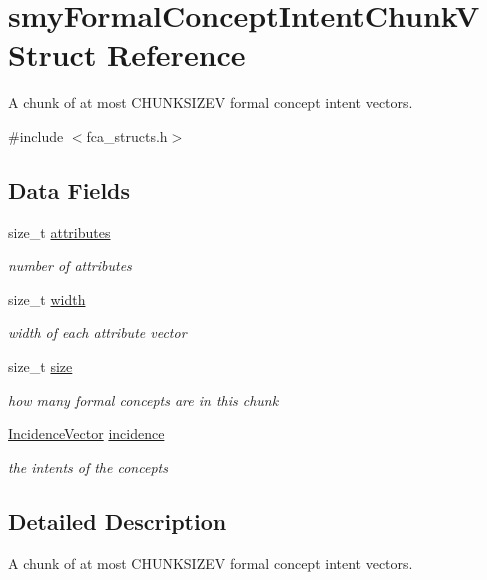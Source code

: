 \hypertarget{structsmyFormalConceptIntentChunkV}{\section{smy\-Formal\-Concept\-Intent\-Chunk\-V \-Struct \-Reference}
\label{structsmyFormalConceptIntentChunkV}
}


\-A chunk of at most \-C\-H\-U\-N\-K\-S\-I\-Z\-E\-V formal concept intent vectors.  




{\ttfamily \#include $<$fca\-\_\-structs.\-h$>$}

\subsection*{\-Data \-Fields}
\begin{DoxyCompactItemize}
\item 
size\-\_\-t \hyperlink{structsmyFormalConceptIntentChunkV_ab40281b9f96435442255be08563782c0}{attributes}
\begin{DoxyCompactList}\small\item\em number of attributes \end{DoxyCompactList}\item 
size\-\_\-t \hyperlink{structsmyFormalConceptIntentChunkV_a34213d18382955bee724884cd2bfd82c}{width}
\begin{DoxyCompactList}\small\item\em width of each attribute vector \end{DoxyCompactList}\item 
size\-\_\-t \hyperlink{structsmyFormalConceptIntentChunkV_acbb0ea8f58b4a13ecefc5a996c386206}{size}
\begin{DoxyCompactList}\small\item\em how many formal concepts are in this chunk \end{DoxyCompactList}\item 
\hyperlink{fca_8h_aae617489ac88fff15979050721fe581f}{\-Incidence\-Vector} \hyperlink{structsmyFormalConceptIntentChunkV_a12a126936dbafdf7ec85de7fed74eb8c}{incidence}
\begin{DoxyCompactList}\small\item\em the intents of the concepts \end{DoxyCompactList}\end{DoxyCompactItemize}


\subsection{\-Detailed \-Description}
\-A chunk of at most \-C\-H\-U\-N\-K\-S\-I\-Z\-E\-V formal concept intent vectors. 

